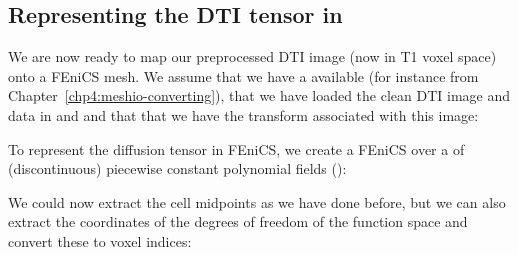 \subsection{Representing the DTI tensor in \fenics{}}
\label{chp5:sec:loading-dti-tensor}

We are now ready to map our preprocessed DTI image (now in T1 voxel
space) onto a FEniCS mesh. We assume that we have a 
available (for instance  from
Chapter~\ref{chp4:meshio-converting}), that we have loaded the clean DTI
image and data in  and  and that that
we have the  transform associated with this image:

To represent the diffusion tensor in FEniCS, we create a FEniCS
 over a  of (discontinuous)
piecewise constant polynomial fields (): 

We could now extract the cell midpoints as we have done before, but we
can also extract the coordinates of the degrees of freedom of the
function space and convert these to voxel indices:

